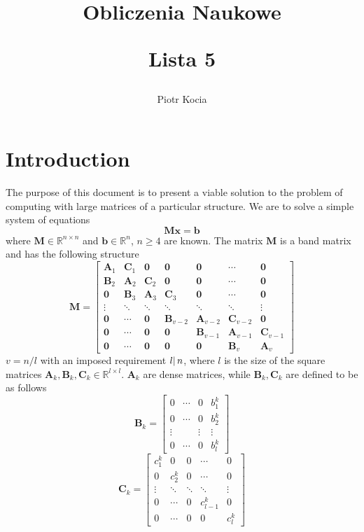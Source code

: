 \documentclass[12pt, a4paper]{article}
\title{
  Obliczenia Naukowe\\
  \begin{center}\Large Lista 5\end{center}
}
\author{Piotr Kocia}
\newcommand{\R}{\mathbb{R}}
\newcommand{\nulldelimiter}{.\kern-\nulldelimiterspace}
\newcommand{\divs}[2]{\left\nulldelimiter#1\middle|\right\nulldelimiter#2}
\begin{document}
\maketitle
\tableofcontents

\section{Introduction}
The purpose of this document is to present a viable solution to the problem of
computing with large matrices of a particular structure. We are to solve a
simple system of equations
$$
\bm{Mx} = \bm{b}
$$
where $\bm{M} \in \R^{n \times n}$ and $\bm{b} \in \R^n$, $n \ge 4$ are known.
The matrix $\bm{M}$ is a band matrix and has the following structure
\begin{equation}
  \bm{M} =
  \begin{bmatrix}
    \bm{A}_1 & \bm{C}_1 & \bm{0} & \bm{0} & \bm{0} & \dotsi & \bm{0} \\
    \bm{B}_2 & \bm{A}_2 & \bm{C}_2 & \bm{0} & \bm{0} & \dotsi & \bm{0} \\
    \bm{0} & \bm{B}_3 & \bm{A}_3 & \bm{C}_3 & \bm{0} & \dotsi & \bm{0} \\
    \vdots & \ddots & \ddots & \ddots & \ddots & \ddots & \vdots \\
    \bm{0} & \dotsi & \bm{0} & \bm{B}_{v-2} & \bm{A}_{v-2} & \bm{C}_{v-2} & \bm{0} \\
    \bm{0} & \dotsi & \bm{0} & \bm{0} & \bm{B}_{v-1} & \bm{A}_{v-1} & \bm{C}_{v-1} \\
    \bm{0} & \dotsi & \bm{0} & \bm{0} & \bm{0} & \bm{B}_{v} & \bm{A}_{v}
  \end{bmatrix}
\end{equation}
$v = n / l$ with an imposed requirement $\divs{l}{n}$, where $l$ is the size of
the square matrices $\bm{A}_k, \bm{B}_k, \bm{C}_k \in \R^{l \times l}$.
$\bm{A}_k$ are dense matrices, while $\bm{B}_k, \bm{C}_k$ are defined to be as
follows
\begin{equation}
  \bm{B}_k =
  \begin{bmatrix}
    0 & \dotsi & 0 & b^k_1 \\
    0 & \dotsi & 0 & b^k_2 \\
    \vdots & & \vdots & \vdots \\
    0 & \dotsi & 0 & b^k_l
  \end{bmatrix}
\end{equation}
\begin{equation}
  \bm{C}_k =
  \begin{bmatrix}
    c^k_1 & 0 & 0 & \dotsi & 0 \\
    0 & c^k_2 & 0 & \dotsi & 0 \\
    \vdots & \ddots & \ddots & \ddots & \vdots \\
    0 & \dotsi & 0 & c^k_{l-1} & 0 \\
    0 & \dotsi & 0 & 0 & c^k_{l}
  \end{bmatrix}
\end{equation}
\end{document}
